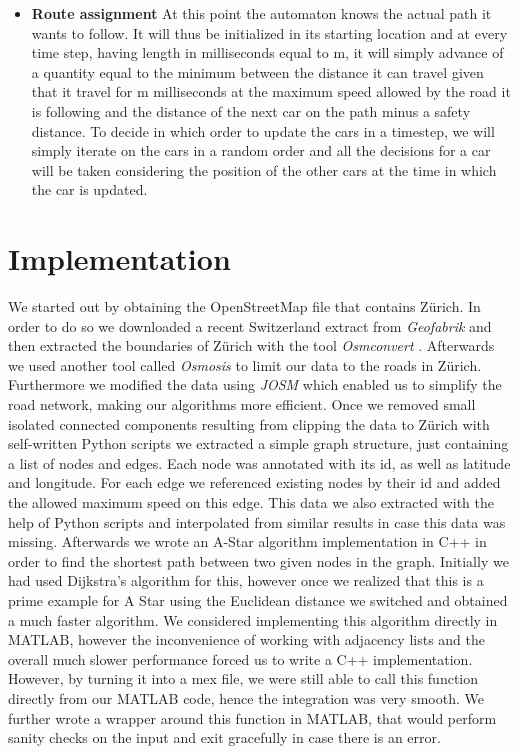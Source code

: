 \documentclass[11pt]{article}
\begin{document}
\begin{itemize}
\item \textbf{Route assignment}
At this point the automaton knows the actual path it wants to follow. It will thus be initialized in its starting location and at every time step, having length in milliseconds equal to m, it will simply advance of a quantity equal to the minimum between the distance it can travel given that it travel for m milliseconds at the maximum speed allowed by the road it is following and the distance of the next car on the path minus a safety distance. To decide in which order to update the cars in a timestep, we will simply iterate on the cars in a random order and all the decisions for a car will be taken considering the position of the other cars at the time in which the car is updated.
\end{itemize}

\section{Implementation}
We started out by obtaining the OpenStreetMap\cite{osm} file that contains Z\"urich.
In order to do so we downloaded a recent Switzerland extract from \emph{Geofabrik} \cite{geofab} and then extracted the boundaries of Z\"urich with the tool \emph{Osmconvert} \cite{osmconv}.
Afterwards we used another tool called \emph{Osmosis}\cite{oosmosis} to limit our data to the roads in Z\"urich.
Furthermore we modified the data using \emph{JOSM} which enabled us to simplify the road network, making our algorithms more efficient.
Once we removed small isolated connected components resulting from clipping the data to Z\"urich with self-written Python scripts
we extracted a simple graph structure, just containing a list of nodes and edges.
Each node was annotated with its id, as well as latitude and longitude.
For each edge we referenced existing nodes by their id and added the allowed maximum speed on this edge.
This data we also extracted with the help of Python scripts and interpolated from similar results in case this data was missing.
Afterwards we wrote an A-Star algorithm implementation in C++ in order to find the shortest path between two given nodes in the graph.
Initially we had used Dijkstra's algorithm for this, however once we realized that this is a prime example for A Star using the Euclidean distance we switched and obtained a much faster algorithm.
We considered implementing this algorithm directly in MATLAB, however the inconvenience of working with adjacency lists and the overall much slower performance forced us to write a C++ implementation.
However, by turning it into a mex file, we were still able to call this function directly from our MATLAB code, hence the integration was very smooth.
We further wrote a wrapper around this function in MATLAB, that would perform sanity checks on the input and exit gracefully in case there is an error.
\end{document}
